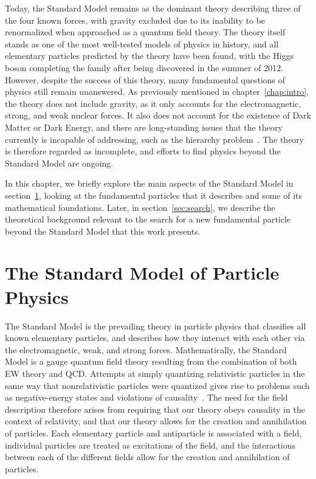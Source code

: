Today, the Standard Model remains as the dominant theory describing three of the four known forces, with gravity excluded due to its inability to be renormalized when approached as a quantum field theory.
The theory itself stands as one of the most well-tested models of physics in history, and all elementary particles predicted by the theory have been found, with the Higgs boson completing the family after being discovered in the summer of 2012.
However, despite the success of this theory, many fundamental questions of physics still remain unanswered.
As previously mentioned in chapter~\ref{chap:intro}, the theory does not include gravity, as it only accounts for the electromagnetic, strong, and weak nuclear forces.
It also does not account for the existence of Dark Matter or Dark Energy, and there are long-standing issues that the theory currently is incapable of addressing, such as the hierarchy problem~\cite{krippendorf2010cambridge}.
The theory is therefore regarded as incomplete, and efforts to find physics beyond the Standard Model are ongoing.

In this chapter, we briefly explore the main aspects of the Standard Model in section~\ref{sec:SM}, looking at the fundamental particles that it describes and some of its mathematical foundations.
Later, in section~\ref{sec:search}, we describe the theoretical background relevant to the search for a new fundamental particle beyond the Standard Model that this work presents.

\section{The Standard Model of Particle Physics}
\label{sec:SM}

The Standard Model is the prevailing theory in particle physics that classifies all known elementary particles, and describes how they interact with each other via the electromagnetic, weak, and strong forces.
Mathematically, the Standard Model is a gauge quantum field theory resulting from the combination of both EW theory and QCD.
Attempts at simply quantizing relativistic particles in the same way that nonrelativistic particles were quantized gives rise to problems such as negative-energy states and violations of causality~\cite{Peskin:257493}.
The need for the field description therefore arises from requiring that our theory obeys causality in the context of relativity, and that our theory allows for the creation and annihilation of particles.
Each elementary particle and antiparticle is associated with a field, individual particles are treated as excitations of the field, and the interactions between each of the different fields allow for the creation and annihilation of particles.

